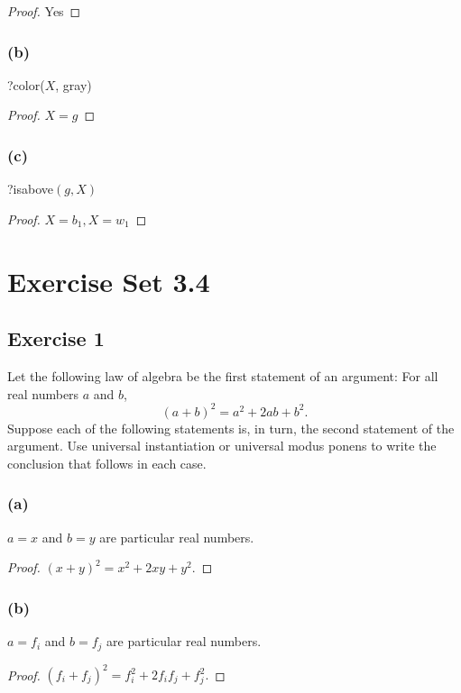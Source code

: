 \documentclass[14pt]{extarticle}
\begin{document}
\begin{proof}
Yes
\end{proof}

\subsubsection{(b)}
?color($X$, gray)

\begin{proof}
$X = g$
\end{proof}

\subsubsection{(c)}
?isabove$(g, X)$

\begin{proof}
$X = b_1, X = w_1$
\end{proof}

\section{Exercise Set 3.4}

\subsection{Exercise 1}
Let the following law of algebra be the first statement of an argument: For all real numbers $a$ and $b$, 
$$
(a + b)^2 = a^2 + 2ab + b^2. 
$$
Suppose each of the following statements is, in turn, the second statement of the argument. Use universal instantiation or universal modus ponens to write the conclusion that follows in each case.

\subsubsection{(a)}
$a = x$ and $b = y$ are particular real numbers.

\begin{proof}
$(x + y)^2 = x^2 + 2xy + y^2.$
\end{proof}

\subsubsection{(b)}
$a = f_i$ and $b = f_j$ are particular real numbers.

\begin{proof}
$(f_i + f_j)^2 = f_i^2 + 2f_if_j + f_j^2. $
\end{proof}
\end{document}
